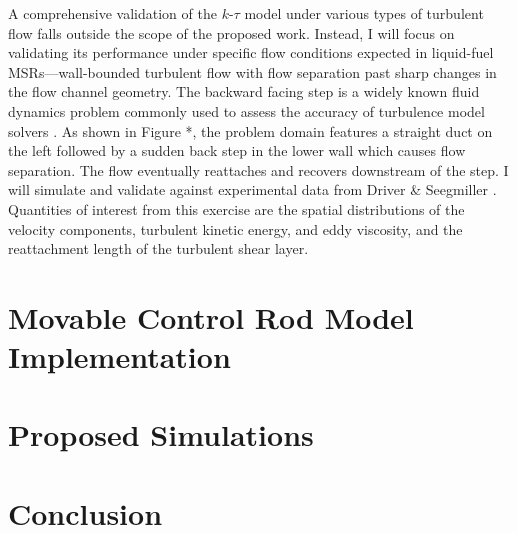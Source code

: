 A comprehensive validation of the $k$-$\tau$ model under various types of
turbulent flow falls outside the scope of the proposed work. Instead, I will
focus on validating its performance under specific flow conditions expected in
liquid-fuel \glspl{MSR}---wall-bounded turbulent flow with flow separation past
sharp changes in the flow channel geometry. The backward facing step is a
widely known fluid dynamics problem commonly used to assess the accuracy of
turbulence model solvers \cite{lasher_computation_1992}. As shown in Figure *,
the problem domain features a straight duct
on the left followed by a sudden back step in the lower wall which causes flow
separation. The flow eventually reattaches and recovers downstream of the step.
I will simulate and validate against experimental data from Driver \&
Seegmiller \cite{driver_features_1985}. Quantities of interest from this
exercise are the spatial distributions of the velocity components, turbulent
kinetic energy, and eddy viscosity, and the reattachment length of the
turbulent shear layer.

\section{Movable Control Rod Model Implementation}

\section{Proposed Simulations}

\section{Conclusion}
